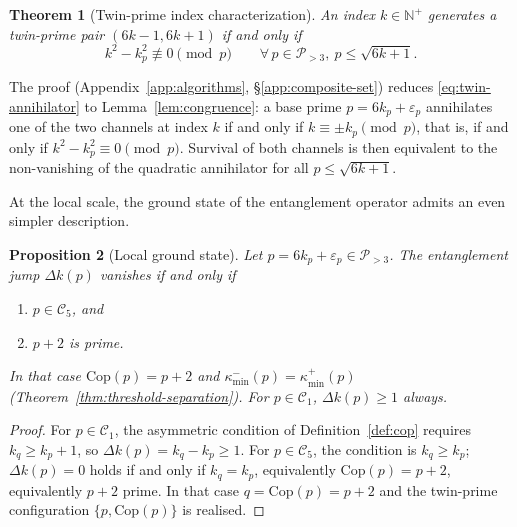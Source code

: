 \documentclass[11pt]{amsart}
\numberwithin{equation}{section}
\newcommand{\NN}{\mathbb{N}}
\newcommand{\cP}{\mathcal{P}}
\newcommand{\kminp}{\kappa_{\min}^{+}}
\newcommand{\kminm}{\kappa_{\min}^{-}}
\newcommand{\Cone}{\mathcal{C}_1}
\newcommand{\Cfive}{\mathcal{C}_5}
\newcommand{\Cop}{\mathrm{Cop}}
\theoremstyle{plain}
\newtheorem{theorem}{Theorem}[section]
\newtheorem{proposition}[theorem]{Proposition}
\theoremstyle{definition}
\begin{document}
\begin{theorem}[Twin-prime index characterization]
\label{thm:ground-state}
An index $k\in\NN^+$ generates a twin-prime pair $(6k-1,6k+1)$ if and
only if
\begin{equation}
k^2-k_p^2\not\equiv 0\pmod p
\qquad\forall\, p\in\cP_{>3},\ p\le\sqrt{6k+1}.
\label{eq:twin-annihilator}
\end{equation}
\end{theorem}

The proof (Appendix~\ref{app:algorithms}, \S\ref{app:composite-set})
reduces \eqref{eq:twin-annihilator} to Lemma~\ref{lem:congruence}: a
base prime $p=6k_p+\varepsilon_p$ annihilates one of the two channels
at index $k$ if and only if $k\equiv\pm k_p\pmod p$, that is, if and
only if $k^2-k_p^2\equiv 0\pmod p$. Survival of both channels is then
equivalent to the non-vanishing of the quadratic annihilator for all
$p\le\sqrt{6k+1}$.

At the local scale, the ground state of the entanglement operator
admits an even simpler description.

\begin{proposition}[Local ground state]
\label{prop:ground-state-local}
Let $p=6k_p+\varepsilon_p\in\cP_{>3}$. The entanglement jump
$\Delta k(p)$ vanishes if and only if
\begin{enumerate}
\item[(i)] $p\in\Cfive$, and
\item[(ii)] $p+2$ is prime.
\end{enumerate}
In that case $\Cop(p)=p+2$ and $\kminm(p)=\kminp(p)$
(Theorem~\ref{thm:threshold-separation}). For $p\in\Cone$,
$\Delta k(p)\ge 1$ always.
\end{proposition}

\begin{proof}
For $p\in\Cone$, the asymmetric condition of Definition~\ref{def:cop}
requires $k_q\ge k_p+1$, so $\Delta k(p)=k_q-k_p\ge 1$. For
$p\in\Cfive$, the condition is $k_q\ge k_p$; $\Delta k(p)=0$ holds if
and only if $k_q=k_p$, equivalently $\Cop(p)=p+2$, equivalently $p+2$
prime. In that case $q=\Cop(p)=p+2$ and the twin-prime configuration
$\{p,\Cop(p)\}$ is realised.
\end{proof}
\end{document}
